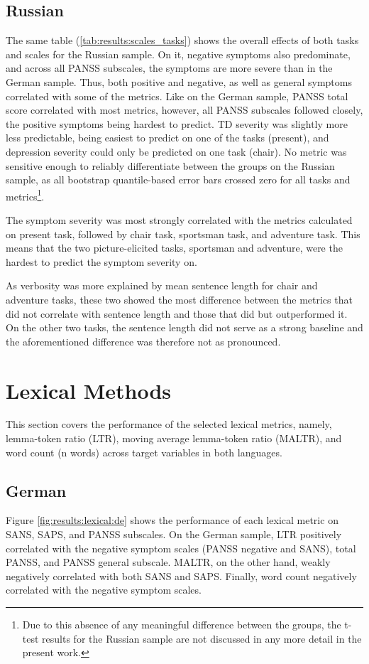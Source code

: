 \subsection{Russian}
The same table (\ref{tab:results:scales_tasks}) shows the overall effects of both tasks and scales for the Russian sample. On it, negative symptoms also predominate, and across all PANSS subscales, the symptoms are more severe than in the German sample. Thus, both positive and negative, as well as general symptoms correlated with some of the metrics. Like on the German sample, PANSS total score correlated with most metrics, however, all PANSS subscales followed closely, the positive symptoms being hardest to predict. TD severity was slightly more less predictable, being easiest to predict on one of the tasks (present), and depression severity could only be predicted on one task (chair). No metric was sensitive enough to reliably differentiate between the groups on the Russian sample, as all bootstrap quantile-based error bars crossed zero for all tasks and metrics\footnote{Due to this absence of any meaningful difference between the groups, the t-test results for the Russian sample are not discussed in any more detail in the present work.}.

The symptom severity was most strongly correlated with the metrics calculated on present task, followed by chair task, sportsman task, and adventure task. This means that the two picture-elicited tasks, sportsman and adventure, were the hardest to predict the symptom severity on. 

As verbosity was more explained by mean sentence length for chair and adventure tasks, these two showed the most difference between the metrics that did not correlate with sentence length and those that did but outperformed it. On the other two tasks, the sentence length did not serve as a strong baseline and the aforementioned difference was therefore not as pronounced.


\section{Lexical Methods}
\label{sec:results:clinical:lexical}
This section covers the performance of the selected lexical metrics, namely, lemma-token ratio (LTR), moving average lemma-token ratio (MALTR), and word count (n words) across target variables in both languages.

\subsection{German}
Figure \ref{fig:results:lexical:de} shows the performance of each lexical metric on SANS, SAPS, and PANSS subscales. On the German sample, LTR positively correlated with the negative symptom scales (PANSS negative and SANS), total PANSS, and PANSS general subscale. MALTR, on the other hand, weakly negatively correlated with both SANS and SAPS. Finally, word count negatively correlated with the negative symptom scales.

